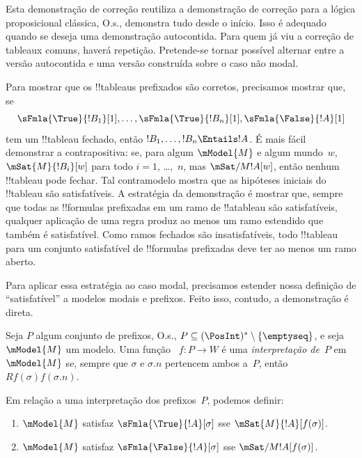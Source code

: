 \documentclass[../../../include/open-logic-section]{subfiles}
\begin{document}


\begin{editorial}
  Esta demonstração de correção reutiliza a demonstração de correção para
  a lógica proposicional clássica, O.s.\@, demonstra tudo desde o início.
  Isso é adequado quando se deseja uma demonstração autocontida. Para quem
  já viu a correção de tableaux comuns, haverá repetição. Pretende-se tornar
  possível alternar entre a versão autocontida e uma versão construída
  sobre o caso não modal.
\end{editorial}

\begin{explain}
  Para mostrar que os !!{tableau}s prefixados são corretos, precisamos
  mostrar que, se
  \[
  \sFmla{\True}{!B_1}[1], \dots, \sFmla{\True}{!B_n}[1], \sFmla{\False}{!A}[1]
  \]
  tem um !!{tableau} fechado, então $!B_1, \dots, !B_n \Entails !A$.
  É mais fácil demonstrar a contrapositiva: se, para algum $\mModel{M}$
  e algum mundo~$w$, $\mSat{M}{!B_i}[w]$ para todo $i=1$, \dots,~$n$,
  mas $\mSat/{M}{!A}[w]$, então nenhum !!{tableau} pode fechar. Tal
  contramodelo mostra que as hipóteses iniciais do !!{tableau} são
  satisfatíveis. A estratégia da demonstração é mostrar que, sempre que
  todas as !!{formula}s prefixadas em um ramo de !!a{tableau} são
  satisfatíveis, qualquer aplicação de uma regra produz ao menos um ramo
  estendido que também é satisfatível. Como ramos fechados são
  insatisfatíveis, todo !!{tableau} para um conjunto satisfatível de
  !!{formula}s prefixadas deve ter ao menos um ramo aberto.

  Para aplicar essa estratégia ao caso modal, precisamos estender nossa
  definição de ``satisfatível'' a modelos modais e prefixos. Feito isso,
  contudo, a demonstração é direta.
\end{explain}

\begin{defn}
  Seja $P$ algum conjunto de prefixos, O.s.\@, $P \subseteq (\PosInt)^*
  \setminus \{\emptyseq\}$, e seja $\mModel{M}$ um modelo. Uma função
  ~$f\colon P \to W$ é uma \emph{interpretação de}~$P$ em~$\mModel{M}$
  se, sempre que $\sigma$ e $\sigma.n$ pertencem ambos a~$P$, então
  $Rf(\sigma)f(\sigma.n)$.

  Em relação a uma interpretação dos prefixos~$P$, podemos definir:
  \begin{enumerate}
  \item $\mModel{M}$ satisfaz $\sFmla{\True}{!A}[\sigma]$ sse
    $\mSat{M}{!A}[f(\sigma)]$.
  \item $\mModel{M}$ satisfaz $\sFmla{\False}{!A}[\sigma]$ sse
    $\mSat/{M}{!A}[f(\sigma)]$.
  \end{enumerate}
\end{defn}
\end{document}
